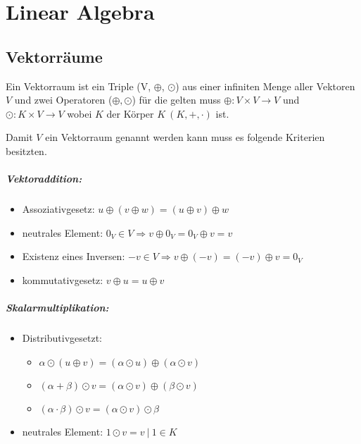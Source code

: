 
\chapter{Linear Algebra}


\section{Vektorräume}

Ein Vektorraum ist ein Triple (V, $\oplus$, $\odot$) aus einer infiniten Menge aller Vektoren $ V $ und zwei Operatoren ($ \oplus, \odot $) für die gelten muss $\oplus : V \times V \rightarrow V $ und $\odot : K \times V \rightarrow V$ wobei $ K $ der Körper $K\ (K, +, \cdot)$ ist. \newline

Damit $ V $ ein Vektorraum genannt werden kann muss es folgende Kriterien besitzten.
\paragraph{Vektoraddition:}

\begin{itemize}
	\item Assoziativgesetz: $ u \oplus ( v \oplus w ) = ( u \oplus v ) \oplus w $
	\item neutrales Element: $ 0_V \in V \Rightarrow v \oplus 0_V = 0_V \oplus v = v $
	\item Existenz eines Inversen: $ -v \in V \Rightarrow v \oplus (-v) = (-v) \oplus v = 0_V $
	\item kommutativgesetz: $v \oplus u = u \oplus v $
\end{itemize}

\paragraph{Skalarmultiplikation:}

\begin{itemize}
	\item Distributivgesetzt: 
	\begin{itemize}
		\item $ \alpha \odot ( u \oplus v) = ( \alpha \odot u ) \oplus ( \alpha \odot v) $
		\item $ ( \alpha + \beta ) \odot v = ( \alpha \odot v ) \oplus ( \beta \odot v) $
		\item $ ( \alpha \cdot \beta ) \odot v = ( \alpha \odot v) \odot \beta $
	\end{itemize} 
	\item  neutrales Element: $ 1 \odot v = v \ \vert \ 1 \in K $
\end{itemize}



